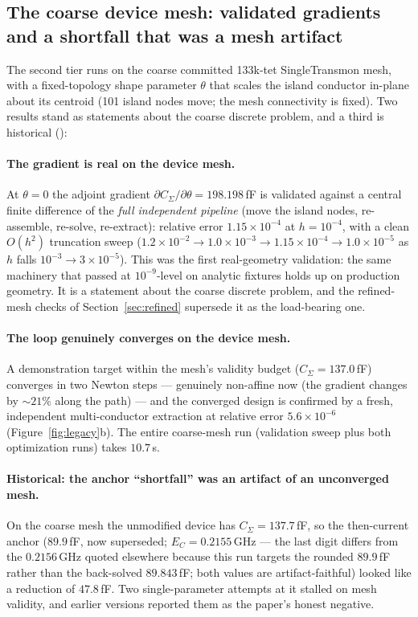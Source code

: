 \documentclass{anvil-paper}
\begin{document}
\subsection{The coarse device mesh: validated gradients and a shortfall that was a mesh artifact}
\label{sec:optdemo-pad}

The second tier runs on the coarse committed 133k-tet SingleTransmon
mesh, with a fixed-topology shape parameter $\theta$ that scales the
island conductor in-plane about its centroid (101 island nodes move;
the mesh connectivity is fixed). Two results stand as statements about
the coarse discrete problem, and a third is historical
():

\paragraph{The gradient is real on the device mesh.} At $\theta = 0$ the
adjoint gradient $\partial C_\Sigma/\partial\theta = 198.198$\,fF is
validated against a central finite difference of the \emph{full
independent pipeline} (move the island nodes, re-assemble, re-solve,
re-extract): relative error $1.15\times10^{-4}$ at $h = 10^{-4}$, with a
clean $O(h^2)$ truncation sweep ($1.2\times10^{-2} \to 1.0\times10^{-3}
\to 1.15\times10^{-4} \to 1.0\times10^{-5}$ as $h$ falls
$10^{-3} \to 3\times10^{-5}$). This was the first real-geometry
validation: the same machinery that passed at $10^{-9}$-level on
analytic fixtures holds up on production geometry. It is a statement
about the coarse discrete problem, and the refined-mesh checks of
Section~\ref{sec:refined} supersede it as the load-bearing one.

\paragraph{The loop genuinely converges on the device mesh.} A
demonstration target within the mesh's validity budget ($C_\Sigma =
137.0$\,fF) converges in two Newton steps --- genuinely non-affine now
(the gradient changes by ${\sim}21\%$ along the path) --- and the
converged design
is confirmed by a fresh, independent multi-conductor extraction at
relative error $5.6\times10^{-6}$ (Figure~\ref{fig:legacy}b). The
entire coarse-mesh run (validation sweep plus both optimization runs)
takes $10.7$\,s.

\paragraph{Historical: the anchor ``shortfall'' was an artifact of an
unconverged mesh.}
On the coarse mesh the unmodified device has $C_\Sigma = 137.7$\,fF, so
the then-current anchor ($89.9$\,fF, now superseded; $E_C =
0.2155$\,GHz --- the last digit differs from the $0.2156$\,GHz quoted
elsewhere because this run targets the rounded $89.9$\,fF rather than
the back-solved $89.843$\,fF; both values are artifact-faithful) looked
like a reduction of $47.8$\,fF. Two single-parameter attempts at it stalled on
mesh validity, and earlier versions reported them as the paper's honest
negative.
\end{document}
